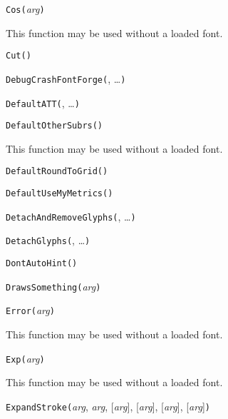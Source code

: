 
\noindent\texttt{Cos(}\textit{arg}\texttt{)}

This function may be used without a loaded font.


\noindent\texttt{Cut(}\texttt{)}


\noindent\texttt{DebugCrashFontForge(}, \ldots\texttt{)}


\noindent\texttt{DefaultATT(}, \ldots\texttt{)}


\noindent\texttt{DefaultOtherSubrs(}\texttt{)}

This function may be used without a loaded font.


\noindent\texttt{DefaultRoundToGrid(}\texttt{)}


\noindent\texttt{DefaultUseMyMetrics(}\texttt{)}


\noindent\texttt{DetachAndRemoveGlyphs(}, \ldots\texttt{)}


\noindent\texttt{DetachGlyphs(}, \ldots\texttt{)}


\noindent\texttt{DontAutoHint(}\texttt{)}


\noindent\texttt{DrawsSomething(}\textit{arg}\texttt{)}


\noindent\texttt{Error(}\textit{arg}\texttt{)}

This function may be used without a loaded font.


\noindent\texttt{Exp(}\textit{arg}\texttt{)}

This function may be used without a loaded font.


\noindent\texttt{ExpandStroke(}\textit{arg}, \textit{arg}, [\textit{arg}], [\textit{arg}], [\textit{arg}], [\textit{arg}]\texttt{)}

